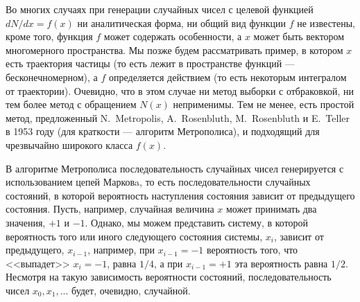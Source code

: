 \documentclass{book}
\begin{document}
Во многих случаях при генерации случайных чисел с целевой функцией $dN/dx = f(x)$ ни аналитическая
форма, ни общий вид функции $f$ не известены, кроме того, функция $f$ может содержать особенности,
а $x$ может быть вектором многомерного пространства. Мы позже будем
рассматривать пример, в котором $x$ есть траектория частицы (то есть лежит в пространстве функций
--- бесконечномерном), а $f$ определяется действием (то есть некоторым интегралом от траектории).
Очевидно, что в этом случае ни метод выборки с отбраковкой, ни тем более метод с обращением $N(x)$
неприменимы. Тем не менее, есть простой метод, предложенный N.~Metropolis, A.~Rosenbluth,
M.~Rosenbluth и E.~Teller в 1953 году (для краткости --- алгоритм Метрополиса), и подходящий для
чрезвычайно широкого класса $f(x)$.

В алгоритме Метрополиса последовательность случайных чисел генерируется с использованием
цепей Марковa, то есть последовательности случайных состояний, в которой вероятность наступления
состояния зависит от предыдущего состояния. Пусть, например, случайная величина $x$ может принимать
два значения, $+1$ и $-1$. Однако, мы можем представить систему, в которой вероятность того или
иного следующего состояния
системы, $x_i$, зависит от предыдущего, $x_{i - 1}$, например, при $x_{i - 1} = -1$ вероятность
того, что <<выпадет>> $x_i = -1$, равна $1/4$, а при $x_{i - 1} = +1$ эта вероятность равна $1/2$.
Несмотря на такую зависимость вероятности состояний, последовательность чисел $x_0, x_1,...$ будет,
очевидно, случайной.
\end{document}
